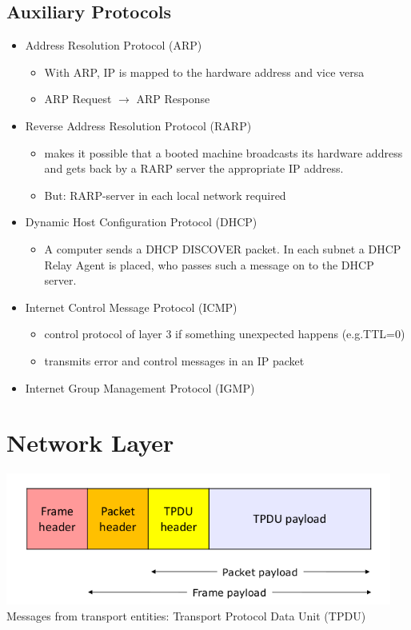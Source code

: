 \documentclass[11pt,ngerman]{article}
\begin{document}
\subsection{Auxiliary	Protocols}
\begin{itemize}[noitemsep,nolistsep]
\item Address	Resolution	Protocol	(ARP)
	\begin{itemize}[noitemsep,nolistsep]
	\item With	ARP,	IP	is	mapped	to	the	hardware	address	and	vice	versa
	\item ARP Request $\rightarrow$ ARP Response
	\end{itemize}
\item Reverse	Address	Resolution	Protocol	(RARP)
	\begin{itemize}[noitemsep,nolistsep]
	\item makes	it	possible	that	a	booted	machine	broadcasts	its	
hardware	address	and	gets	back	by	a	RARP	server	the	appropriate	IP	
address.	
	\item But: RARP-server in each local network required
	\end{itemize}
\item Dynamic	Host	Configuration	Protocol	(DHCP)
	\begin{itemize}[noitemsep,nolistsep]
	\item A computer	sends	a	DHCP	DISCOVER	packet.	In	each	subnet	a	
DHCP	Relay	Agent	is	placed,	who	passes	such	a	message	on	to	the	DHCP	
server.
	\end{itemize}
\item Internet	Control	Message	Protocol	(ICMP)
	\begin{itemize}[noitemsep,nolistsep]
	\item control	protocol	of	layer	3 if something unexpected happens (e.g.TTL=0)
	\item 	transmits	error	and	control	messages in an IP packet
	\end{itemize}
\item Internet	Group	Management	Protocol	(IGMP)
\end{itemize}

\section{Network Layer}
\includegraphics[width=5in]{images/Selection_020.png}\\
Messages	from	transport	entities:	
Transport	Protocol	Data	Unit	(TPDU)
\end{document}
